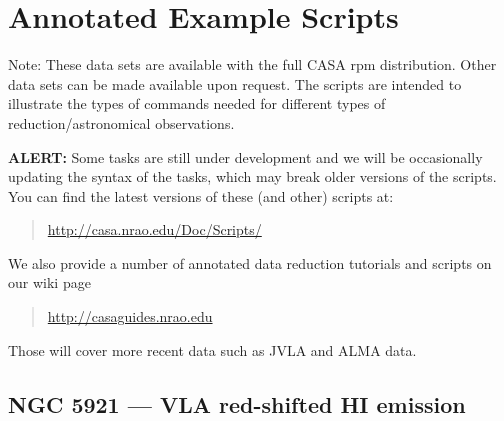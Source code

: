 

\chapter[Appendix: Annotated Example Scripts]{Annotated Example Scripts}
\label{chapter:scripts}

Note: These data sets are available with the full
CASA rpm distribution.  Other data sets can be made available upon
request.  The scripts are intended to illustrate the types of
commands needed for different types of reduction/astronomical
observations.

{\bf ALERT:} Some tasks are still under development and we will be
occasionally updating the syntax of the tasks, which may break older
versions of the scripts. You can find the latest versions of these
(and other) scripts at:
\begin{quote}
   \url{http://casa.nrao.edu/Doc/Scripts/}
\end{quote}

We also provide a number of annotated data reduction tutorials and
scripts on our wiki page 

\begin{quote}
\url{http://casaguides.nrao.edu}
\end{quote}

Those will cover more recent data such as JVLA and ALMA data.

\section{NGC 5921 --- VLA red-shifted HI emission}
\label{section:scripts.ngc5921}

